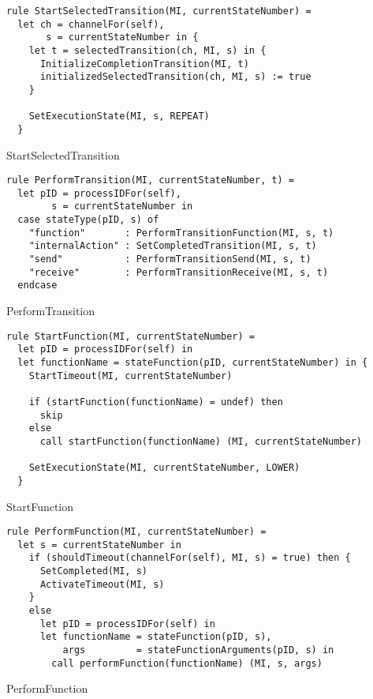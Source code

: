\begin{listing}[H]
\begin{verbatim}
rule StartSelectedTransition(MI, currentStateNumber) =
  let ch = channelFor(self),
       s = currentStateNumber in {
    let t = selectedTransition(ch, MI, s) in {
      InitializeCompletionTransition(MI, t)
      initializedSelectedTransition(ch, MI, s) := true
    }

    SetExecutionState(MI, s, REPEAT)
  }
\end{verbatim}
\caption{StartSelectedTransition}
\label{lst:asm:StartSelectedTransition}
\end{listing}




\begin{listing}[H]
\begin{verbatim}
rule PerformTransition(MI, currentStateNumber, t) =
  let pID = processIDFor(self),
        s = currentStateNumber in
  case stateType(pID, s) of
    "function"       : PerformTransitionFunction(MI, s, t)
    "internalAction" : SetCompletedTransition(MI, s, t)
    "send"           : PerformTransitionSend(MI, s, t)
    "receive"        : PerformTransitionReceive(MI, s, t)
  endcase
\end{verbatim}
\caption{PerformTransition}
\label{lst:asm:PerformTransition}
\end{listing}



\begin{listing}[H]
\begin{verbatim}
rule StartFunction(MI, currentStateNumber) =
  let pID = processIDFor(self) in
  let functionName = stateFunction(pID, currentStateNumber) in {
    StartTimeout(MI, currentStateNumber)

    if (startFunction(functionName) = undef) then
      skip
    else
      call startFunction(functionName) (MI, currentStateNumber)

    SetExecutionState(MI, currentStateNumber, LOWER)
  }
\end{verbatim}
\caption{StartFunction}
\label{lst:asm:StartFunction}
\end{listing}




\begin{listing}[H]
\begin{verbatim}
rule PerformFunction(MI, currentStateNumber) =
  let s = currentStateNumber in
    if (shouldTimeout(channelFor(self), MI, s) = true) then {
      SetCompleted(MI, s)
      ActivateTimeout(MI, s)
    }
    else
      let pID = processIDFor(self) in
      let functionName = stateFunction(pID, s),
          args         = stateFunctionArguments(pID, s) in
        call performFunction(functionName) (MI, s, args)
\end{verbatim}
\caption{PerformFunction}
\label{lst:asm:PerformFunction}
\end{listing}




